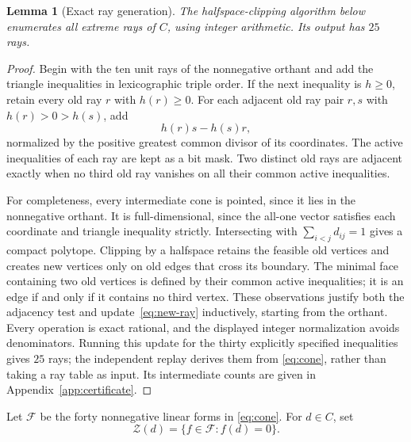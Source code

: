\documentclass[11pt]{article}
\newtheorem{lemma}[theorem]{Lemma}
\theoremstyle{definition}
\theoremstyle{remark}
\begin{document}
\begin{lemma}[Exact ray generation]\label{lem:rays}
The halfspace-clipping algorithm below enumerates all extreme rays of $C$,
using integer arithmetic. Its output has $25$ rays.
\end{lemma}
\begin{proof}
Begin with the ten unit rays of the nonnegative orthant and add the
triangle inequalities in lexicographic triple order. If the next
inequality is $h\geq0$, retain every old ray $r$ with $h(r)\geq0$.
For each adjacent old ray pair $r,s$ with $h(r)>0>h(s)$, add
\begin{equation}\label{eq:new-ray}
 h(r)s-h(s)r,
\end{equation}
normalized by the positive greatest common divisor of its coordinates.
The active inequalities of each ray are kept as a bit mask. Two distinct
old rays are adjacent exactly when no third old ray vanishes on all their
common active inequalities.

For completeness, every intermediate cone is pointed, since it lies in
the nonnegative orthant. It is full-dimensional, since the all-one vector
satisfies each coordinate and triangle inequality strictly. Intersecting
with $\sum_{i<j}d_{ij}=1$ gives a compact polytope. Clipping by a halfspace
retains the feasible old vertices and creates new vertices only on old
edges that cross its boundary. The minimal face containing two old
vertices is defined by their common active inequalities; it is an edge
if and only if it contains no third vertex. These observations justify
both the adjacency test and update~\eqref{eq:new-ray} inductively, starting
from the orthant. Every operation is exact rational, and the displayed
integer normalization avoids denominators. Running this update for the
thirty explicitly specified inequalities gives $25$ rays; the independent
replay derives them from \eqref{eq:cone}, rather than taking a ray table
as input. Its intermediate counts are given in
Appendix~\ref{app:certificate}.
\end{proof}

Let $\mathcal F$ be the forty nonnegative linear forms in
\eqref{eq:cone}. For $d\in C$, set
\[
 \mathcal Z(d)=\{f\in\mathcal F:f(d)=0\}.
\]
\end{document}
